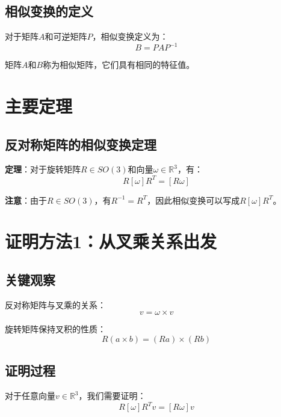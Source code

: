 \documentclass[12pt,a4paper]{article}
\begin{document}
\subsection{相似变换的定义}

对于矩阵$A$和可逆矩阵$P$，相似变换定义为：
\begin{equation}
B = P A P^{-1}
\end{equation}

矩阵$A$和$B$称为相似矩阵，它们具有相同的特征值。

\section{主要定理}

\subsection{反对称矩阵的相似变换定理}

\textbf{定理}：对于旋转矩阵$R \in SO(3)$和向量$\omega \in \mathbb{R}^3$，有：
\begin{equation}
R [\omega] R^T = [R \omega]
\end{equation}

\textbf{注意}：由于$R \in SO(3)$，有$R^{-1} = R^T$，因此相似变换可以写成$R [\omega] R^T$。

\section{证明方法1：从叉乘关系出发}

\subsection{关键观察}

反对称矩阵与叉乘的关系：
\begin{equation}
[\omega] v = \omega \times v
\end{equation}

旋转矩阵保持叉积的性质：
\begin{equation}
R(a \times b) = (Ra) \times (Rb)
\end{equation}

\subsection{证明过程}

对于任意向量$v \in \mathbb{R}^3$，我们需要证明：
\begin{equation}
R [\omega] R^T v = [R \omega] v
\end{equation}
\end{document}
